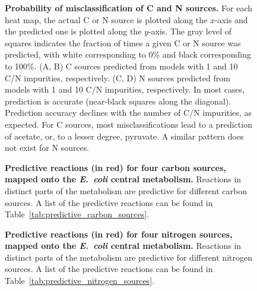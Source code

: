 \documentclass[12pt]{article}
\begin{document}
\clearpage
\begin{figure}[p]
\caption{\label{fig:heat_map}\textbf{Probability of misclassification of C and N sources.} For each heat map, the actual C or N source is plotted along the $x$-axis and the predicted one is plotted along the $y$-axis. The gray level of squares indicates the fraction of times a given C or N source was predicted, with white corresponding to 0\% and black corresponding to 100\%. (A, B) C sources predicted from models with 1 and 10 C/N impurities, respectively. (C, D) N sources predicted from models with 1 and 10 C/N impurities, respectively. In most cases, prediction is accurate (near-black squares along the diagonal). Prediction accuracy declines with the number of C/N impurities, as expected. For C sources, most misclassifications lead to a prediction of acetate, or, to a lesser degree, pyruvate. A similar pattern does not exist for N sources.}
\end{figure}

\clearpage
\begin{figure}[p]
\caption{\label{fig:carbon_network}\textbf{Predictive reactions (in red) for four carbon sources, mapped onto the \emph{E.\ coli} central metabolism.} Reactions in distinct parts of the metabolism are predictive for different carbon sources. A list of the predictive reactions can be found in Table~\ref{tab:predictive_carbon_sources}.}
\end{figure}

\clearpage
\begin{figure}[p]
\caption{\label{fig:nitrogen_network}\textbf{Predictive reactions (in red) for four nitrogen sources, mapped onto the \emph{E.\ coli} central metabolism.} Reactions in distinct parts of the metabolism are predictive for different nitrogen sources. A list of the predictive reactions can be found in Table~\ref{tab:predictive_nitrogen_sources}.}
\end{figure}


\clearpage
\end{document}
